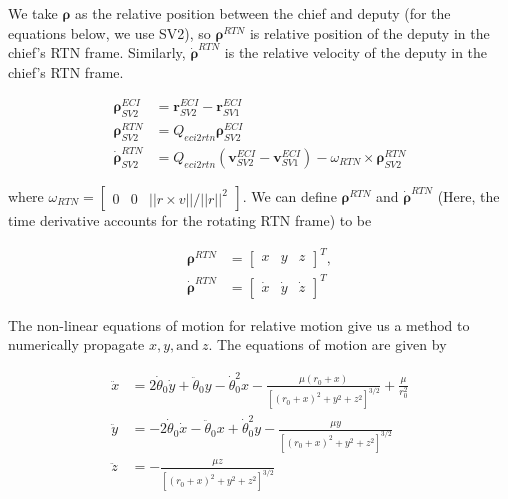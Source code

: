 We take $\boldsymbol{\rho}$ as the relative position between the chief and deputy (for the equations below, we use SV2), so $\boldsymbol{\rho}^{RTN}$ is relative position of the deputy in the chief's RTN frame. Similarly, $\boldsymbol{\dot{\rho}}^{RTN}$ is the relative velocity of the deputy in the chief's RTN frame.

\begin{align}
    \boldsymbol{\rho}_{SV2}^{ECI} &= \boldsymbol{r}^{ECI}_{SV2} - \boldsymbol{r}^{ECI}_{SV1}\\
    \boldsymbol{\rho}^{RTN}_{SV2} &= Q_{eci2rtn} \boldsymbol{\rho}_{SV2}^{ECI} \\
    \boldsymbol{\dot{\rho}}^{RTN}_{SV2} &= Q_{eci2rtn} \left(\boldsymbol{v}^{ECI}_{SV2} - \boldsymbol{v}^{ECI}_{SV1}\right)  - \omega_{RTN} \times \boldsymbol{\rho}^{RTN}_{SV2} \label{eq:v_rtn_rel}
\end{align}

where $\omega_{RTN} = \begin{bmatrix}
    0 & 0 & ||r\times v ||/||r||^2
\end{bmatrix}$. We can define $\boldsymbol{\rho}^{RTN}$ and $\boldsymbol{\dot{\rho}}^{RTN}$ (Here, the time derivative accounts for the rotating RTN frame) to be

\begin{align}
    \boldsymbol{\rho}^{RTN} &= \begin{bmatrix}
        x & y & z
    \end{bmatrix}^T, \\
    \boldsymbol{\dot{\rho}}^{RTN} &= \begin{bmatrix}
        \dot{x} & \dot{y} & \dot{z}
    \end{bmatrix}^T 
\end{align}

The non-linear equations of motion for relative motion give us a method to numerically propagate $x, y, \text{and} \ z$. The equations of motion are given by

\begin{align}
\ddot{x} &= 2\dot{\theta}_0 \dot{y} + \ddot{\theta}_0 y - \dot{\theta}_0^2 x -\frac{\mu (r_0 + x)}{\left[(r_0 + x)^2 + y^2 + z^2\right]^{3/2}} + \frac{\mu}{r_0^2} \\
\ddot{y} &= - 2\dot{\theta}_0 \dot{x} - \ddot{\theta}_0 x + \dot{\theta}_0^2 y  -\frac{\mu y}{\left[(r_0 + x)^2 + y^2 + z^2\right]^{3/2}} \\
\ddot{z} &= -\frac{\mu z}{\left[(r_0 + x)^2 + y^2 + z^2\right]^{3/2}}
\end{align}

